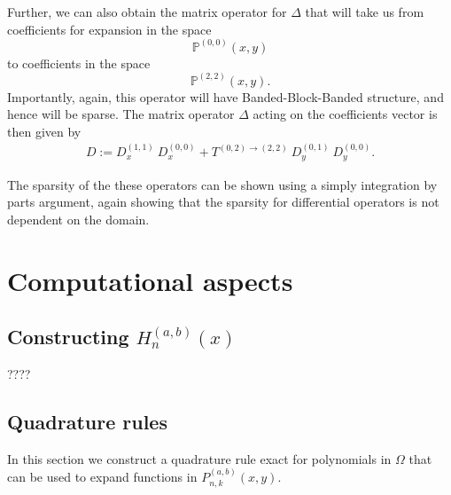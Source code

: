 \documentclass[11pt, oneside]{article}   	%
\newcommand{\bigP}{\mathbb{P}}
\newcommand{\bigPoo}{{\mathbb{P}^{(0,0)}}}
\begin{document}
Further, we can also obtain the matrix operator for \(\Delta\) that will take us from coefficients for expansion in the space
\[
\bigPoo(x,y)
\]
to coefficients in the space
\[
\bigP^{(2,2)}(x,y).
\]
Importantly, again, this operator will have Banded-Block-Banded structure, and hence will be sparse. The matrix operator \(\Delta\) acting on the coefficients vector is then given by
\begin{align}
    D := D_x^{(1,1)} \: D_x^{(0,0)} + T^{(0,2)\to(2,2)} \: D_y^{(0,1)} \: D_y^{(0,0)}.
\end{align}

The sparsity of the these operators can be shown using a simply integration by parts argument, again showing that the sparsity for differential operators is not dependent on the domain.


\section{Computational aspects}\label{Section:Computation}

\subsection{Constructing $H_n^{(a,b)}(x)$}

????


\subsection{Quadrature rules}

In this section we construct a quadrature rule exact for polynomials in $\Omega$ that can be used to expand functions in $P_{n,k}^{(a,b)}(x,y)$. 
\end{document}
